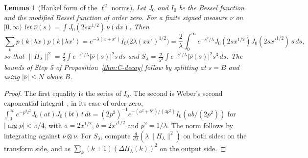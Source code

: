 \documentclass[10pt,letterpaper]{article}
\newtheorem{lemma}[theorem]{Lemma}
\begin{document}
\begin{lemma}[Hankel form of the $\ell^2$ norms]\label{lem:C-hankel}
Let $J_0$ and $I_0$ be the Bessel function and the modified Bessel function of order zero. For a finite signed measure $\nu$ on
$[0,\infty)$ let $\hat\nu(s)=\int J_0(2sx^{1/2})\,\nu(dx)$. Then
\[
\sum_kp(k\,|\,\lambda x)p(k\,|\,\lambda x')=e^{-\lambda(x+x')}I_0\bigl(2\lambda(xx')^{1/2}\bigr)
=\frac2\lambda\int_0^\infty e^{-s^2/\lambda}J_0(2sx^{1/2})J_0(2sx'^{1/2})\,s\,ds,
\]
so that $\|H_\lambda\|^2=\frac2\lambda\int e^{-s^2/\lambda}|\hat\nu(s)|^2s\,ds$ and $S_\lambda=\frac2{\lambda^2}\int e^{-s^2/\lambda}|\hat\nu(s)|^2s^3\,ds$.
The bounds of Step 5 of Proposition~\ref{thm:C-decay} follow by splitting at $s=B$ and using $|\hat\nu|\le N$ above $B$.
\end{lemma}
\begin{proof}
The first equality is the series of $I_0$. The second is Weber's second exponential integral~\cite[13.31(1)]{Watson1922},
in its case of order zero, $\int_0^\infty e^{-p^2t^2}J_0(at)J_0(bt)\,t\,dt=(2p^2)^{-1}e^{-(a^2+b^2)/(4p^2)}I_0(ab/(2p^2))$ for
$|\arg p|<\pi/4$, with $a=2x^{1/2}$, $b=2x'^{1/2}$ and $p^2=1/\lambda$. The norm follows by integrating against
$\nu\otimes\nu$. For $S_\lambda$, compute $\frac{d}{d\lambda}(\lambda\|H_\lambda\|^2)$ on both sides: on the transform side, and as
$\sum_k(k+1)(\Delta H_\lambda(k))^2$ on the output side.
\end{proof}
\end{document}
